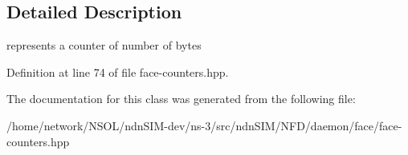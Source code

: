 \subsection{Detailed Description}
represents a counter of number of bytes 

Definition at line 74 of file face-\/counters.\+hpp.



The documentation for this class was generated from the following file\+:\begin{DoxyCompactItemize}
\item 
/home/network/\+N\+S\+O\+L/ndn\+S\+I\+M-\/dev/ns-\/3/src/ndn\+S\+I\+M/\+N\+F\+D/daemon/face/face-\/counters.\+hpp\end{DoxyCompactItemize}
